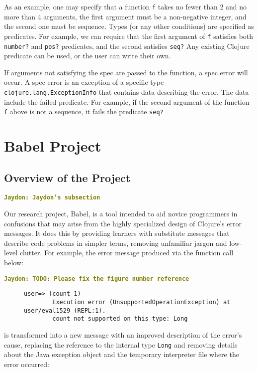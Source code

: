 \documentclass[12pt]{article}
\newcommand{\comment}[1]{{\bf \tt  {#1}}}
\newcommand{\jscomment}[1]{\textcolor{olive}{\comment{Jaydon: {#1}}}}
\begin{document}
As an example, one may specify that a function \texttt{f} takes no fewer than 2 and no more than 4 arguments, the first argument must be a non-negative integer, and the second one must be sequence. 
Types (or any other conditions) are specified as predicates. 
For example, we can require that the first argument of \texttt{f} satisfies both \texttt{number?} and \texttt{pos?} predicates, and the second satisfies \texttt{seq?}
Any existing Clojure predicate can be used, or the user can write their own. 

If arguments not satisfying the spec are passed to the function, a spec error will occur. 
A spec error is an exception of a specific type \texttt{clojure.lang.ExceptionInfo} that contains data describing the error. 
The data include the failed predicate.
For example, if the second argument of the function 
\texttt{f} above is not a sequence, it fails the predicate \texttt{seq?}

\section{Babel Project}\label{sec:babel}
\subsection{Overview of the Project}\label{subsec:overview}
\jscomment{Jaydon's subsection}

Our research project, Babel, is a tool intended to aid novice programmers in confusions that may arise from the highly specialized design of Clojure's error messages. It does this by providing learners with substitute messages that describe code problems in simpler terms, removing unfamiliar jargon and low-level clutter. For example, the error message produced via the function call below:

\jscomment{TODO: Please fix the figure number reference}

\begin{figure}[h]
	\centering
	\begin{lstlisting}[breaklines=true, basicstyle=\ttfamily]
        user=> (count 1)
        Execution error (UnsupportedOperationException) at user/eval1529 (REPL:1).
        count not supported on this type: Long
	\end{lstlisting}
\end{figure}

is transformed into a new message with an improved description of the error's cause, replacing the reference to the internal type \verb|Long| and removing details about the Java exception object and the temporary interpreter file where the error occurred:
\end{document}
